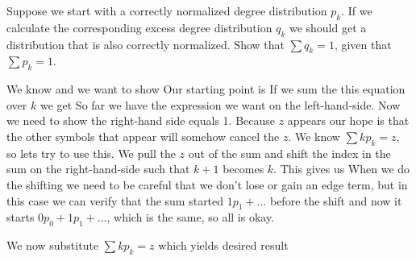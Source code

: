 Suppose we start with a correctly normalized degree distribution $p_k$. If we calculate the corresponding excess degree distribution $q_k$ we should get a distribution that is also correctly normalized. Show that $\sum q_k=1$, given that  $\sum p_k=1$. 

\solution
We know 
and we want to show
Our starting point is 
If we sum the this equation over $k$ we get 
So far we have the expression we want on the left-hand-side. Now we need to show the right-hand side equals 1. Because $z$ appears our hope is that the other symbols that appear will somehow cancel the $z$. We know $\sum kp_k=z$, so lets try to use this. We pull the $z$ out of the sum and shift the index in the sum on the right-hand-side such that $k+1$ becomes $k$. This gives us
When we do the shifting we need to be careful that we don't lose or gain an edge term, but in this case we can verify that the sum started $1p_1+\ldots$ before the shift and now it starts $0p_0+1p_1+\ldots$, which is the same, so all is okay. 

We now substitute $\sum kp_k=z$ which yields desired result
